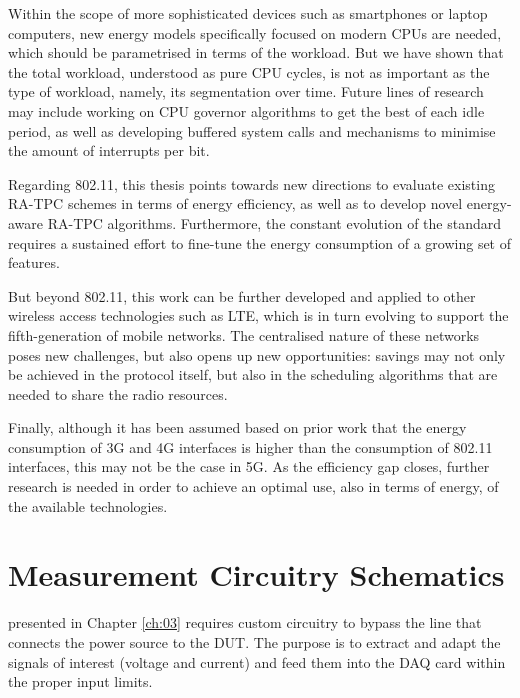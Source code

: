\documentclass[twoside,nohyper]{tufte-book}
\theoremstyle{definition}
\theoremstyle{definition}
\theoremstyle{definition}
\theoremstyle{remark}
\begin{document}
Within the scope of more sophisticated devices such as smartphones or
laptop computers, new energy models specifically focused on modern CPUs
are needed, which should be parametrised in terms of the workload. But
we have shown that the total workload, understood as pure CPU cycles, is
not as important as the type of workload, namely, its segmentation over
time. Future lines of research may include working on CPU governor
algorithms to get the best of each idle period, as well as developing
buffered system calls and mechanisms to minimise the amount of
interrupts per bit.

Regarding 802.11, this thesis points towards new directions to evaluate
existing RA-TPC schemes in terms of energy efficiency, as well as to
develop novel energy-aware RA-TPC algorithms. Furthermore, the constant
evolution of the standard requires a sustained effort to fine-tune the
energy consumption of a growing set of features.

But beyond 802.11, this work can be further developed and applied to
other wireless access technologies such as LTE, which is in turn
evolving to support the fifth-generation of mobile networks. The
centralised nature of these networks poses new challenges, but also
opens up new opportunities: savings may not only be achieved in the
protocol itself, but also in the scheduling algorithms that are needed
to share the radio resources.

Finally, although it has been assumed based on prior work that the
energy consumption of 3G and 4G interfaces is higher than the
consumption of 802.11 interfaces, this may not be the case in 5G. As the
efficiency gap closes, further research is needed in order to achieve an
optimal use, also in terms of energy, of the available technologies.

\hypertarget{appendix-appendix}{%
\appendix}


\hypertarget{measurement-circuitry-schematics}{%
\chapter{Measurement Circuitry
Schematics}\label{measurement-circuitry-schematics}}

 presented in Chapter
\ref{ch:03} requires custom circuitry to bypass the line that connects
the power source to the DUT. The purpose is to extract and adapt the
signals of interest (voltage and current) and feed them into the DAQ
card within the proper input limits.
\end{document}
